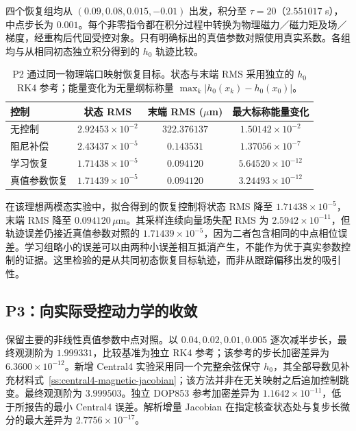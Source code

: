 四个恢复组均从 $(0.09,0.08,0.015,-0.01)$ 出发，积分至 $\tau=20$（$2.551017$ s），中点步长为 $0.001$。每个非零指令都在积分过程中转换为物理磁力／磁力矩及场／梯度，经重构后代回受控对象。只有明确标出的真值参数对照使用真实系数。各组均与从相同初态独立积分得到的 $h_0$ 轨迹比较。

\begin{table}[t]
\centering
\caption{P2 通过同一物理端口映射恢复目标。状态与末端 RMS 采用独立的 $h_0$ RK4 参考；能量变化为无量纲标称量 $\max_k|h_0(x_k)-h_0(x_0)|$。}
\label{num:a-table}
\begin{tabular}{lccc}
\toprule
控制 & 状态 RMS & 末端 RMS ($\mu$m) & 最大标称能量变化\\
\midrule
无控制 & $2.92453\times10^{-2}$ & $322.376137$ & $1.50142\times10^{-2}$ \\
阻尼补偿 & $2.43437\times10^{-5}$ & $0.143531$ & $1.37056\times10^{-7}$ \\
学习恢复 & $1.71438\times10^{-5}$ & $0.094120$ & $5.64520\times10^{-12}$ \\
真值参数恢复 & $1.71439\times10^{-5}$ & $0.094120$ & $3.24493\times10^{-12}$ \\
\bottomrule
\end{tabular}
\end{table}

在该理想两模态实验中，拟合得到的恢复控制将状态 RMS 降至 $1.71438\times10^{-5}$，末端 RMS 降至 $0.094120\,\mu$m。其采样连续向量场失配 RMS 为 $2.5942\times10^{-11}$，但轨迹误差仍接近真值参数对照的 $1.71439\times10^{-5}$，因为二者包含相同的中点相位误差。学习组略小的误差可以由两种小误差相互抵消产生，不能作为优于真实参数控制的证据。这里检验的是从共同初态恢复目标轨迹，而非从跟踪偏移出发的吸引性。

\subsection{P3：向实际受控动力学的收敛}
\label{num:p3}
\label{num:integration}
保留主要的非线性真值参数中点对照。以 $0.04,0.02,0.01,0.005$ 逐次减半步长，最终观测阶为 $1.999331$，比较基准为独立 RK4 参考；该参考的步长加密差异为 $6.3600\times10^{-12}$。新增 Central4 实验采用同一个完整余弦保守 $h_0$，其全部导数见补充材料式~\eqref{ss:central4-magnetic-jacobian}；该方法并非在无关映射之后追加控制跳变。最终观测阶为 $3.999503$。独立 DOP853 参考加密差异为 $1.1642\times10^{-11}$，低于所报告的最小 Central4 误差。解析增量 Jacobian 在指定核查状态处与复步长微分的最大差异为 $2.7756\times10^{-17}$。


